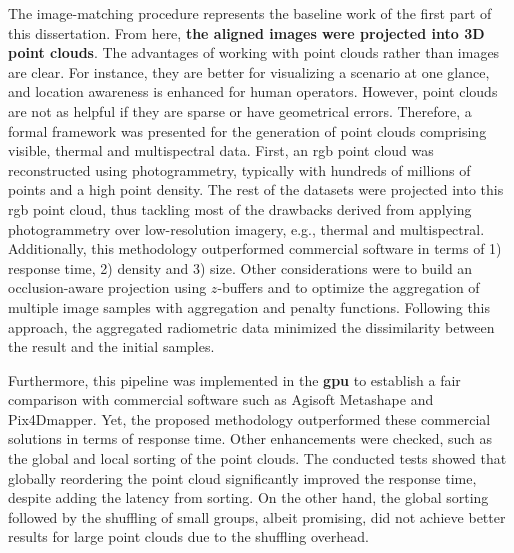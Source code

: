 The image-matching procedure represents the baseline work of the first part of this dissertation. From here, \textbf{the aligned images were projected into 3D point clouds}. The advantages of working with point clouds rather than images are clear. For instance, they are better for visualizing a scenario at one glance, and location awareness is enhanced for human operators. However, point clouds are not as helpful if they are sparse or have geometrical errors. Therefore, a formal framework was presented for the generation of point clouds comprising visible, thermal and multispectral data. First, an \acrshort{rgb} point cloud was reconstructed using photogrammetry, typically with hundreds of millions of points and a high point density. The rest of the datasets were projected into this \acrshort{rgb} point cloud, thus tackling most of the drawbacks derived from applying photogrammetry over low-resolution imagery, e.g., thermal and multispectral. Additionally, this methodology outperformed commercial software in terms of 1) response time, 2) density and 3) size. Other considerations were to build an occlusion-aware projection using $z$-buffers and to optimize the aggregation of multiple image samples with aggregation and penalty functions. Following this approach, the aggregated radiometric data minimized the dissimilarity between the result and the initial samples. 

Furthermore, this pipeline was implemented in the \textbf{\acrshort{gpu}} to establish a fair comparison with commercial software such as Agisoft Metashape and Pix4Dmapper. Yet, the proposed methodology outperformed these commercial solutions in terms of response time. Other enhancements were checked, such as the global and local sorting of the point clouds. The conducted tests showed that globally reordering the point cloud significantly improved the response time, despite adding the latency from sorting. On the other hand, the global sorting followed by the shuffling of small groups, albeit promising, did not achieve better results for large point clouds due to the shuffling overhead. 

